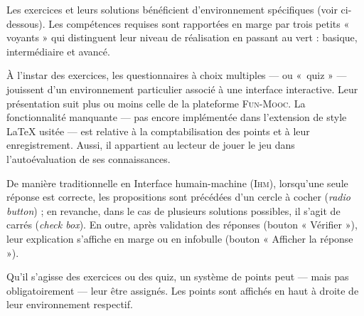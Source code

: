 Les exercices et leurs solutions bénéficient d'environnement spécifiques (voir ci-dessous). Les compétences requises sont rapportées en marge par trois petits « voyants » qui distinguent leur niveau de réalisation en passant au vert : basique, intermédiaire et avancé. 

\begin{exercise*}[title={Exercice de style}, before skip=8pt, level=intermediate, points=2 points]
\lipsum[2]
\end{exercise*}

\begin{solution*}[title={Solution non moins de style}, before skip=8pt, level=intermediate, points=2 points]
\lipsum[2]
\end{solution*}


À l’instar des exercices, les questionnaires à choix multiples --- ou «~quiz » --- jouissent d'un environnement particulier associé à une interface interactive. Leur présentation suit plus ou moins celle de la plateforme \textsc{Fun-Mooc}. La fonctionnalité manquante --- pas encore implémentée dans l'extension de style \LaTeX{} usitée --- est relative à la comptabilisation des points et à leur enregistrement. Aussi, il appartient au lecteur de jouer le jeu dans l'autoévaluation de ses connaissances.

De manière traditionnelle en Interface humain-machine (\textsc{Ihm}), lorsqu'une seule réponse est correcte, les propositions sont précédées d'un cercle à cocher (\emph{radio button}) ; en revanche, dans le cas de plusieurs solutions possibles, il s'agit de carrés (\emph{check box}). En outre, après validation des réponses (bouton « Vérifier »), leur explication s'affiche en marge ou en infobulle (bouton « Afficher la réponse »).

Qu'il s'agisse des exercices ou des quiz, un système de points peut --- mais pas obligatoirement --- leur être assignés. Les points sont affichés en haut à droite de leur environnement respectif.

\vspace{6pt}


